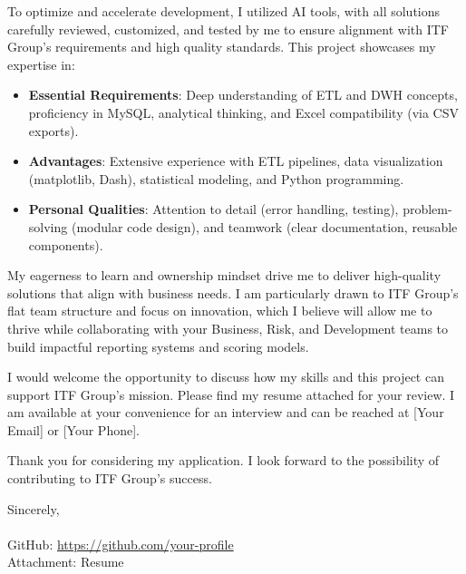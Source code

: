 \documentclass[a4paper,12pt]{article}
\begin{document}
To optimize and accelerate development, I utilized AI tools, with all solutions carefully reviewed, customized, and tested by me to ensure alignment with ITF Group’s requirements and high quality standards. This project showcases my expertise in:

\begin{itemize}
    \item \textbf{Essential Requirements}: Deep understanding of ETL and DWH concepts, proficiency in MySQL, analytical thinking, and Excel compatibility (via CSV exports).
    \item \textbf{Advantages}: Extensive experience with ETL pipelines, data visualization (matplotlib, Dash), statistical modeling, and Python programming.
    \item \textbf{Personal Qualities}: Attention to detail (error handling, testing), problem-solving (modular code design), and teamwork (clear documentation, reusable components).
\end{itemize}

My eagerness to learn and ownership mindset drive me to deliver high-quality solutions that align with business needs. I am particularly drawn to ITF Group’s flat team structure and focus on innovation, which I believe will allow me to thrive while collaborating with your Business, Risk, and Development teams to build impactful reporting systems and scoring models.

I would welcome the opportunity to discuss how my skills and this project can support ITF Group’s mission. Please find my resume attached for your review. I am available at your convenience for an interview and can be reached at [Your Email] or [Your Phone].

Thank you for considering my application. I look forward to the possibility of contributing to ITF Group’s success.

Sincerely, \\
[Your Full Name] \\
GitHub: \url{https://github.com/your-profile} \\
Attachment: Resume
\end{document}
